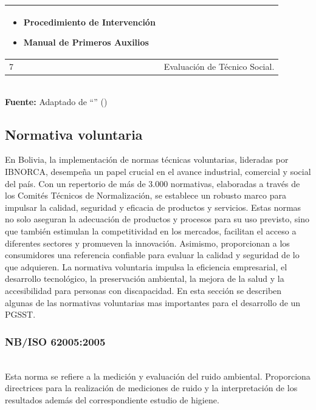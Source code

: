 \begin{table}[htpb]
\begin{center}
\begin{tabular}{|m{1cm}| m{14cm}|}
\begin{itemize}[noitemsep,topsep=0pt,parsep=0pt,partopsep=0pt]
                \item Procedimiento de Intervención
                \item Manual de Primeros Auxilios 
                \vspace*{-\baselineskip}
            \end{itemize}
            \\ \hline
            7 & Evaluación de Técnico Social.  \\
			\hline
		\end{tabular}\\[0.5cm]
		\footnotesize{\textbf{Fuente:} Adaptado de ``'' (\citeyear{cahuasiquitadiseno})}
	\end{center}
\end{table}

\subsection{Normativa voluntaria}
En Bolivia, la implementación de normas técnicas voluntarias, lideradas por IBNORCA, desempeña un papel crucial en el avance industrial, comercial y social del país. Con un repertorio de más de 3.000 normativas, elaboradas a través de los Comités Técnicos de Normalización, se establece un robusto marco para impulsar la calidad, seguridad y eficacia de productos y servicios. Estas normas no solo aseguran la adecuación de productos y procesos para su uso previsto, sino que también estimulan la competitividad en los mercados, facilitan el acceso a diferentes sectores y promueven la innovación. Asimismo, proporcionan a los consumidores una referencia confiable para evaluar la calidad y seguridad de lo que adquieren. La normativa voluntaria impulsa la eficiencia empresarial, el desarrollo tecnológico, la preservación ambiental, la mejora de la salud y la accesibilidad para personas con discapacidad. En esta sección se describen algunas de las normativas voluntarias mas importantes para el desarrollo de un PGSST.

\subsubsection{NB/ISO 62005:2005}\hfill\\ %
\indent
Esta norma se refiere a la medición y evaluación del ruido ambiental. Proporciona directrices para la realización de mediciones de ruido y la interpretación de los resultados además del correspondiente estudio de higiene.

